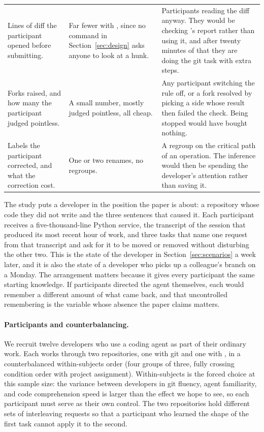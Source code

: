 \begin{table}[t]
\begin{tabular}{@{}p{}p{}p{}@{}}
    Lines of diff the participant opened before submitting.
      & Far fewer with \sgt{}, since no command in
        Section~\ref{sec:design} asks anyone to look at a hunk.
      & Participants reading the diff anyway. They would be checking \sgt{}'s
        report rather than using it, and after twenty minutes of that they are
        doing the git task with extra steps. \\[0.6ex]
    Forks \sgt{} raised, and how many the participant judged pointless.
      & A small number, mostly judged pointless, all cheap.
      & Any participant switching the rule off, or a fork resolved by picking a
        side whose result then failed the check. Being stopped would have bought
        nothing. \\[0.6ex]
    Labels the participant corrected, and what the correction cost.
      & One or two renames, no regroups.
      & A regroup on the critical path of an operation. The inference would then
        be spending the developer's attention rather than saving it. \\
    \bottomrule
  \end{tabular}
\end{table}

The study puts a developer in the position the paper is about: a repository whose
code they did not write and the three sentences that caused it. Each participant
receives a five-thousand-line Python service, the transcript of the session that
produced its most recent hour of work, and three tasks that name one request from
that transcript and ask for it to be moved or removed without disturbing the other
two. This is the state of the developer in Section~\ref{sec:scenarios} a week
later, and it is also the state of a developer who picks up a colleague's branch
on a Monday. The arrangement matters because it gives every participant the same
starting knowledge. If participants directed the agent themselves, each would
remember a different amount of what came back, and that uncontrolled remembering
is the variable whose absence the paper claims matters.

\paragraph{Participants and counterbalancing.}
We recruit twelve developers who use a coding agent as part of their ordinary
work. Each works through two repositories, one with git and one with \sgt{}, in a
counterbalanced within-subjects order (four groups of three, fully crossing
condition order with project assignment). Within-subjects is the forced choice at
this sample size: the variance between developers in git fluency, agent
familiarity, and code comprehension speed is larger than the effect we hope to see,
so each participant must serve as their own control. The two repositories hold
different sets of interleaving requests so that a participant who learned the shape
of the first task cannot apply it to the second.

